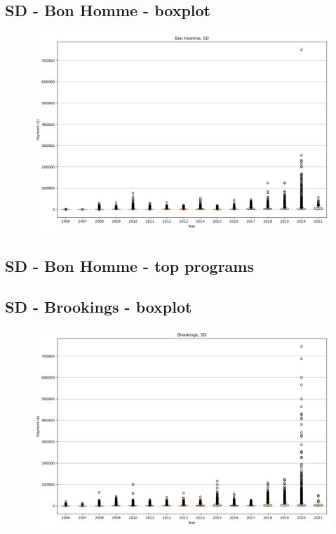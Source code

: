 \subsection*{SD - Bon Homme - boxplot}
\begin{figure}[h]
\centering
\includegraphics[width=7in]{../output/boxplots/counties/Bon Homme-SD_boxplot.png}
\end{figure}


\subsection*{SD - Bon Homme - top programs}

\newpage
\subsection*{SD - Brookings - boxplot}
\begin{figure}[h]
\centering
\includegraphics[width=7in]{../output/boxplots/counties/Brookings-SD_boxplot.png}
\end{figure}


